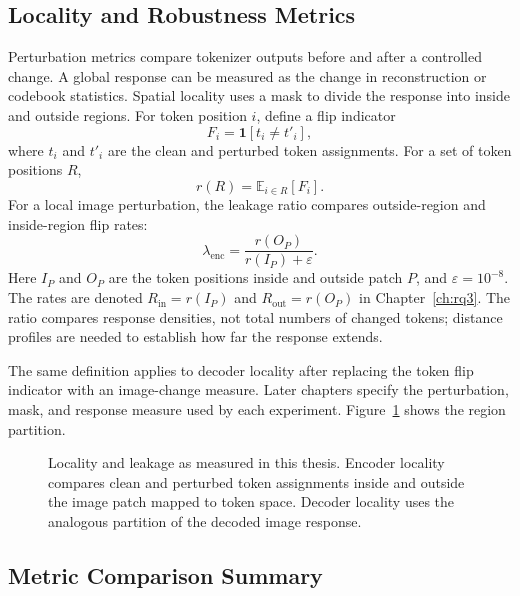\subsection{Locality and Robustness Metrics}
\label{subsec:locality_robustness_metrics}

Perturbation metrics compare tokenizer outputs before and after a controlled
change. A global response can be measured as the change in reconstruction or
codebook statistics. Spatial locality uses a mask to divide the response into
inside and outside regions. For token position $i$, define a flip indicator
\begin{equation}
    F_i = \mathbf{1}[t_i \ne t'_i],
\end{equation}
where $t_i$ and $t'_i$ are the clean and perturbed token assignments. For a set of token positions $R$,
\begin{equation}
    r(R) = \mathbb{E}_{i\in R}[F_i].
\end{equation}
For a local image perturbation, the leakage ratio compares outside-region and
inside-region flip rates:
\begin{equation}
    \lambda_{\mathrm{enc}} =
    \frac{r(O_P)}
         {r(I_P)+\varepsilon}.
\end{equation}
Here $I_P$ and $O_P$ are the token positions inside and outside patch $P$,
and $\varepsilon=10^{-8}$. The rates are denoted $R_{\mathrm{in}}=r(I_P)$ and
$R_{\mathrm{out}}=r(O_P)$ in Chapter~\ref{ch:rq3}. The ratio compares response
densities, not total numbers of changed tokens; distance profiles are needed
to establish how far the response extends.

The same definition applies to decoder locality after replacing the token flip
indicator with an image-change measure. Later chapters specify the perturbation,
mask, and response measure used by each experiment.
Figure~\ref{fig:locality_leakage_curve} shows the region partition.

\begin{figure}[t]
    \centering
    \resizebox{0.9\textwidth}{!}{}
    \caption{Locality and leakage as measured in this thesis. Encoder locality compares clean and perturbed token assignments inside and outside the image patch mapped to token space. Decoder locality uses the analogous partition of the decoded image response.}
    \label{fig:locality_leakage_curve}
\end{figure}

\subsection{Metric Comparison Summary}
\label{subsec:metric_comparison_summary}

